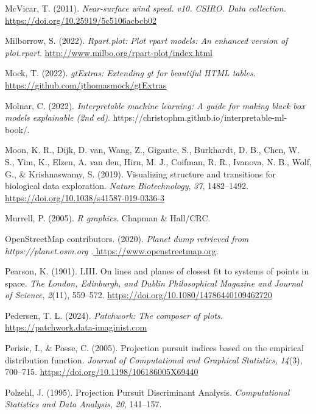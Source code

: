 \documentclass[
  letterpaper,
]{krantz}
\newlength{\cslhangindent}
\newenvironment{CSLReferences}[2] %
 {\begin{list}{}{%
  \setlength{\itemindent}{0pt}
  \setlength{\leftmargin}{0pt}
  \setlength{\parsep}{0pt}
  \ifodd #1
   \setlength{\leftmargin}{\cslhangindent}
   \setlength{\itemindent}{-1\cslhangindent}
  \fi
  \setlength{\itemsep}{#2\baselineskip}}}
 {\end{list}}
\begin{document}
\begin{CSLReferences}{1}{0}
McVicar, T. (2011). \emph{Near-surface wind speed. v10. CSIRO. Data
collection.} \url{https://doi.org/10.25919/5c5106acbcb02}

Milborrow, S. (2022). \emph{Rpart.plot: Plot rpart models: An enhanced
version of plot.rpart}. \url{http://www.milbo.org/rpart-plot/index.html}

Mock, T. (2022). \emph{gtExtras: Extending gt for beautiful HTML
tables}. \url{https://github.com/jthomasmock/gtExtras}

Molnar, C. (2022). \emph{Interpretable machine learning: A guide for
making black box models explainable (2nd ed)}.
https://christophm.github.io/interpretable-ml-book/.

Moon, K. R., Dijk, D. van, Wang, Z., Gigante, S., Burkhardt, D. B.,
Chen, W. S., Yim, K., Elzen, A. van den, Hirn, M. J., Coifman, R. R.,
Ivanova, N. B., Wolf, G., \& Krishnaswamy, S. (2019). Visualizing
structure and transitions for biological data exploration. \emph{Nature
Biotechnology}, \emph{37}, 1482--1492.
\url{https://doi.org/10.1038/s41587-019-0336-3}

Murrell, P. (2005). \emph{R graphics}. Chapman \& Hall/CRC.

OpenStreetMap contributors. (2020). \emph{{Planet dump retrieved from
https://planet.osm.org
}}.\href{\%20https://www.openstreetmap.org\%20}{ https://www.openstreetmap.org}.

Pearson, K. (1901). LIII. On lines and planes of closest fit to systems
of points in space. \emph{The London, Edinburgh, and Dublin
Philosophical Magazine and Journal of Science}, \emph{2}(11), 559--572.
\url{https://doi.org/10.1080/14786440109462720}

Pedersen, T. L. (2024). \emph{Patchwork: The composer of plots}.
\url{https://patchwork.data-imaginist.com}

Perisic, I., \& Posse, C. (2005). Projection pursuit indices based on
the empirical distribution function. \emph{Journal of Computational and
Graphical Statistics}, \emph{14}(3), 700--715.
\url{https://doi.org/10.1198/106186005X69440}

Polzehl, J. (1995). Projection {P}ursuit {D}iscriminant {A}nalysis.
\emph{Computational Statistics and Data Analysis}, \emph{20}, 141--157.


\end{CSLReferences}
\end{document}
